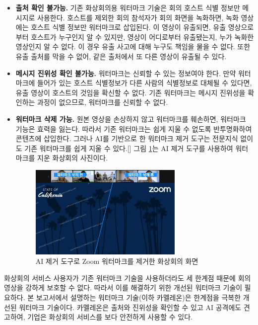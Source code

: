 \begin{itemize}
    \item \textbf{출처 확인 불가능.} 기존 화상회의용 워터마크 기술은 회의 호스트
    식별 정보만 메시지로 사용한다. 호스트를 제외한 회의 참석자가 회의 화면을
    녹화하면, 녹화 영상에는 호스트 식별 정보만 워터마크로 삽입된다. 이 영상이
    유출되면, 유출 영상으로부터 호스트가 누구인지 알 수 있지만, 영상이
    어디로부터 유출됐는지, 누가 녹화한 영상인지 알 수 없다. 이 경우 유출 사고에
    대해 누구도 책임을 물을 수 없다. 또한 유출 출처를 막을 수 없어, 같은
    출처에서 또 다른 영상이 유출될 수 있다.
    \item \textbf{메시지 진위성 확인 불가능.} 워터마크는 신뢰할 수 있는 정보여야
    한다. 만약 워터마크에 들어가 있는 호스트 식별정보가 다른 사람의 식별정보로
    대체될 수 있다면, 유출 영상이 호스트의 것임을 확신할 수 없다. 기존
    워터마크는 메시지 진위성을 확인하는 과정이 없으므로, 워터마크를 신뢰할 수
    없다.
    \item \textbf{워터마크 삭제 가능.} 원본 영상을 손상하지 않고 워터마크를
    훼손하면, 워터마크 기능은 효력을 잃는다. 따라서 기존 워터마크는 쉽게 지울 수
    없도록 반투명화하여 콘텐츠에 삽입한다. 그러나 AI를 기반으로 한 워터마크 제거
    도구는 전문지식 없이도 기존 워터마크를 쉽게 지울 수 있다.[] 그림
    \ref{fig:wm_removed}는 AI 제거 도구를 사용하여 워터마크를 지운 화상회의
    사진이다.
    \begin{figure}[ht]
        \vspace{10pt}
        \centering
        \includegraphics[width=0.7\textwidth]{imgs/wm_removed.png}
        \caption{AI 제거 도구로 Zoom 워터마크를 제거한 화상회의 화면}
        \label{fig:wm_removed}
    \end{figure}
\end{itemize}

화상회의 서비스 사용자가 기존 워터마크 기술을 사용하더라도 세 한계점 때문에
회의영상을 강하게 보호할 수 없다. 따라서 이를 해결하기 위한 개선된 워터마크
기술이 필요하다. 본 보고서에서 설명하는 워터마크 기술(이하 카멜레온)은 한계점을
극복한 개선된 워터마크 기술이다. 카멜레온은 출처와 진위성을 확인할 수 있고 AI
공격에도 견고하여, 기업은 화상회의 서비스를 보다 안전하게 사용할 수 있다.

